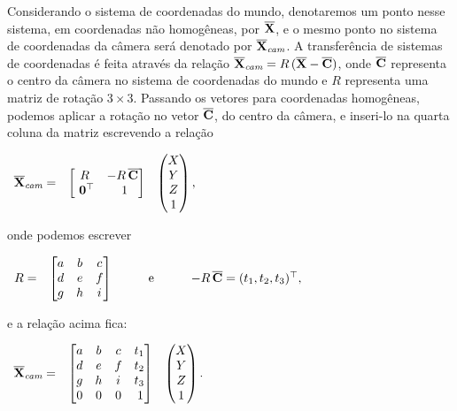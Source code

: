 Considerando o sistema de coordenadas do mundo, denotaremos um ponto nesse sistema, em coordenadas não homogêneas, por $\overline{\mathbf{X}}$, e o mesmo ponto no sistema de coordenadas da câmera será denotado por $\overline{\mathbf{X}}_{\textit{cam}}$. A transferência de sistemas de coordenadas é feita através da relação $\overline{\mathbf{X}}_{\textit{cam}}=R\,(\overline{\mathbf{X}}-\overline{\bf C})$, onde $\overline{\bf C}$ representa o centro da câmera no sistema de coordenadas do mundo e $R$ representa uma matriz de rotação $3\times3$. Passando os vetores para coordenadas homogêneas, podemos aplicar a rotação no vetor $\overline{\bf C}$, do centro da câmera, e inseri-lo na quarta coluna da matriz escrevendo a relação

\begin{center}
$
\begin{array}{ccc}
\overline{\mathbf{X}}_{\textit{cam}}=
&
\begin{bmatrix}
R&-R\,\overline{\bf C}\\
\,\,{\bf 0}^\top&\,\,1
\end{bmatrix}
&
\begin{pmatrix}
X\\
Y\\
Z\\
1
\end{pmatrix},
\end{array}
$
\end{center} 
onde podemos escrever

\begin{center}
$
\begin{array}{cccc}
R=
&
\begin{bmatrix}
a&b&c\\
d&e&f\\
g&h&i
\end{bmatrix}
&
\qquad\text{e}\qquad
&
-R\,\overline{\bf C}=(t_1,t_2,t_3)^\top,
\end{array}
$
\end{center}
e a relação acima fica:

\begin{center}
$
\begin{array}{ccc}
\overline{\mathbf{X}}_{\textit{cam}}=
&
\begin{bmatrix}
a&b&c&t_1\\
d&e&f&t_2\\
g&h&i&t_3\\
0&0&0&\,1
\end{bmatrix}
&
\begin{pmatrix}
X\\
Y\\
Z\\
1
\end{pmatrix}.
\end{array}
$
\end{center}

